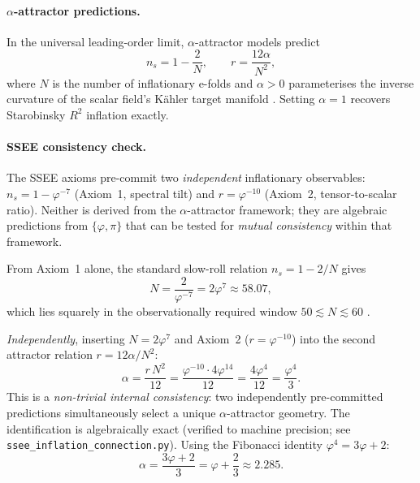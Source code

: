\paragraph{$\alpha$-attractor predictions.}
In the universal leading-order limit, $\alpha$-attractor models predict
\begin{equation}
  n_s = 1 - \frac{2}{N}, \qquad
  r   = \frac{12\alpha}{N^{2}},
  \label{eq:alpha_attractor}
\end{equation}
where $N$ is the number of inflationary e-folds and $\alpha > 0$
parameterises the inverse curvature of the scalar field's K\"{a}hler target
manifold \citep{KalloshLinde2013,Ferrara2013}.
Setting $\alpha = 1$ recovers Starobinsky $R^{2}$ inflation \citep{Starobinsky1980} exactly.

\paragraph{SSEE consistency check.}
The SSEE axioms pre-commit two \emph{independent} inflationary observables:
$n_s = 1-\varphi^{-7}$ (Axiom~1, spectral tilt) and $r = \varphi^{-10}$
(Axiom~2, tensor-to-scalar ratio).
Neither is derived from the $\alpha$-attractor framework;
they are algebraic predictions from $\{\varphi,\pi\}$ that can be tested
for \emph{mutual consistency} within that framework.

From Axiom~1 alone, the standard slow-roll relation $n_s = 1 - 2/N$ gives
\begin{equation}
  N = \frac{2}{\varphi^{-7}} = 2\varphi^{7} \approx 58.07,
  \label{eq:N_ssee}
\end{equation}
which lies squarely in the observationally required window $50\lesssim N\lesssim 60$
\citep{Akrami2020}.

\emph{Independently}, inserting $N = 2\varphi^{7}$ and Axiom~2 ($r = \varphi^{-10}$)
into the second attractor relation $r = 12\alpha/N^2$:
\begin{equation}
  \alpha = \frac{r\,N^{2}}{12}
         = \frac{\varphi^{-10}\cdot 4\varphi^{14}}{12}
         = \frac{4\varphi^{4}}{12}
         = \frac{\varphi^{4}}{3}.
  \label{eq:alpha_ssee}
\end{equation}
This is a \emph{non-trivial internal consistency}: two independently pre-committed
predictions simultaneously select a unique $\alpha$-attractor geometry.
The identification is algebraically exact (verified to machine precision;
see \texttt{ssee\_inflation\_connection.py}).
Using the Fibonacci identity $\varphi^{4} = 3\varphi + 2$:
\begin{equation}
  \alpha = \frac{3\varphi + 2}{3} = \varphi + \frac{2}{3} \approx 2.285.
  \label{eq:alpha_fibonacci}
\end{equation}

